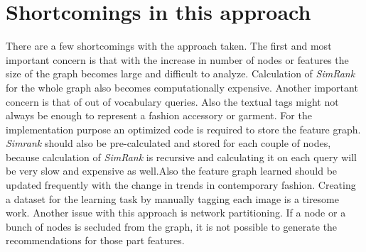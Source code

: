 \section{Shortcomings in this approach}
There are a few shortcomings with the approach taken. The first and most important concern is that with the increase in number of nodes or features the size of the graph becomes large and difficult to analyze. Calculation of \emph{SimRank} for the whole graph also becomes computationally expensive. Another important concern is that of out of vocabulary queries. Also the textual tags might not always be enough to represent a fashion accessory or garment. For the implementation purpose an optimized code is required to store the feature graph. \emph{Simrank} should also be pre-calculated and stored for each couple of nodes, because calculation of \emph{SimRank} is recursive and calculating it on each query will be very slow and expensive as well.Also the feature graph learned should be updated frequently with the change in trends in contemporary fashion. Creating a dataset for the learning task by manually tagging each image is a tiresome work. Another issue with this approach is network partitioning. If a node or a bunch of nodes is secluded from the graph, it is not possible to generate the recommendations for those part features.